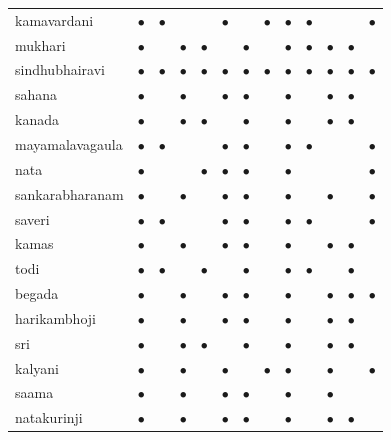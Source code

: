 \begin{table}
\begin{tabular}{ l : L{0.25cm} : L{0.25cm} : L{0.25cm} : L{0.8cm} : L{0.3cm} : L{0.3cm} : L{0.3cm} : L{0.25cm} : L{0.3cm} : L{0.8cm} : L{0.9cm} : L{0.3cm}: }
			\gls{kamavardani} & $\bullet$ & $\bullet$ &  &  & $\bullet$ &  & $\bullet$ & $\bullet$ & $\bullet$ &  &  & $\bullet$\tabularnewline
			\gls{mukhari} & $\bullet$ &  & $\bullet$ & $\bullet$ &  & $\bullet$ &  & $\bullet$ & $\bullet$ & $\bullet$ & $\bullet$ & \tabularnewline
			\gls{sindhubhairavi} & $\bullet$ & $\bullet$ & $\bullet$ & $\bullet$ & $\bullet$  & $\bullet$ & $\bullet$ & $\bullet$ & $\bullet$ &$\bullet$ & $\bullet$ &  $\bullet$ \tabularnewline
			\gls{sahana} & $\bullet$ &  & $\bullet$ &  & $\bullet$ & $\bullet$ &  & $\bullet$ &  & $\bullet$ & $\bullet$ & \tabularnewline
			\gls{kanada} & $\bullet$ &  & $\bullet$ & $\bullet$ &  & $\bullet$ &  & $\bullet$ &  & $\bullet$ & $\bullet$ & \tabularnewline
			\gls{mayamalavagaula} & $\bullet$ & $\bullet$ &  &  & $\bullet$ & $\bullet$ &  & $\bullet$ & $\bullet$ &  &  & $\bullet$\tabularnewline
			\gls{nata} & $\bullet$ &  &  & $\bullet$ & $\bullet$ & $\bullet$ &  & $\bullet$ &  &  &  & $\bullet$\tabularnewline
			\gls{sankarabharanam} & $\bullet$ &  & $\bullet$ &  & $\bullet$ & $\bullet$ &  & $\bullet$ &  & $\bullet$ &  & $\bullet$\tabularnewline
			\gls{saveri} & $\bullet$ & $\bullet$ &  &  & $\bullet$ & $\bullet$ &  & $\bullet$ & $\bullet$ &  &  & $\bullet$ \tabularnewline
			\gls{kamas} & $\bullet$ &  & $\bullet$ &  & $\bullet$ & $\bullet$ &  & $\bullet$ &  & $\bullet$ & $\bullet$ & \tabularnewline
			\gls{todi} & $\bullet$ & $\bullet$ &  & $\bullet$ &  & $\bullet$ &  & $\bullet$ & $\bullet$ &  &  $\bullet$  &\tabularnewline
			\gls{begada} & $\bullet$ &  & $\bullet$ &  & $\bullet$ & $\bullet$ &  & $\bullet$ &  & $\bullet$ & $\bullet$ & $\bullet$\tabularnewline
			\gls{harikambhoji} & $\bullet$ &  & $\bullet$ &  & $\bullet$ & $\bullet$ &  & $\bullet$ &  & $\bullet$ & $\bullet$ & \tabularnewline
			\gls{sri} & $\bullet$ &  & $\bullet$ & $\bullet$ &  & $\bullet$ &  & $\bullet$ &  &  $\bullet$ & $\bullet$ & \tabularnewline
			\gls{kalyani} & $\bullet$ &  & $\bullet$ &  & $\bullet$ &  & $\bullet$ & $\bullet$ &  & $\bullet$ &  & $\bullet$\tabularnewline
			\gls{saama} & $\bullet$ &  & $\bullet$ &  & $\bullet$ & $\bullet$ &  & $\bullet$ &  & $\bullet$ &  & \tabularnewline
			\gls{natakurinji} & $\bullet$ &  & $\bullet$ &  & $\bullet$ & $\bullet$ &  & $\bullet$ &  & $\bullet$ & $\bullet$ & \tabularnewline

\end{tabular}
\end{table}
